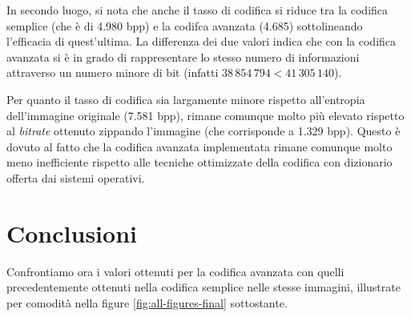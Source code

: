 In secondo luogo, si nota che anche il tasso di codifica si riduce tra la codifica semplice (che è di 4.980 bpp) e la codifca avanzata (4.685) sottolineando l'efficacia di quest'ultima. La differenza dei due valori indica che con la codifica avanzata si è in grado di rappresentare lo stesso numero di informazioni attraverso un numero minore di bit (infatti $38\,854\,794 < 41\,305\,140$).

Per quanto il tasso di codifica sia largamente minore rispetto all'entropia dell'immagine originale (7.581 bpp), rimane comunque molto più elevato rispetto al \textsl{bitrate} ottenuto zippando l'immagine (che corrisponde a 1.329 bpp). Questo è dovuto al fatto che la codifica avanzata implementata rimane comunque molto meno inefficiente rispetto alle tecniche ottimizzate della codifica con dizionario offerta dai sistemi operativi.




\vspace{25px}\section{Conclusioni}
Confrontiamo ora i valori ottenuti per la codifica avanzata con quelli precedentemente ottenuti nella codifica semplice nelle stesse immagini, illustrate per comodità nella figure \ref{fig:all-figures-final} sottostante.

